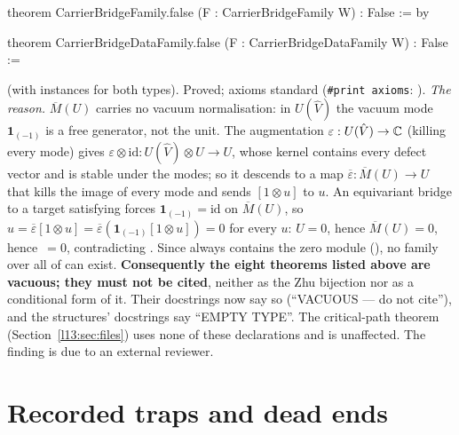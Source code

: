 \begin{warning}[title={The MU track's carrier-bridge families are empty: its ``trophy'' theorems are vacuous (serious; found by an external reviewer)}]
\begin{leancode}
theorem CarrierBridgeFamily.false (F : CarrierBridgeFamily W) : False := by

theorem CarrierBridgeDataFamily.false (F : CarrierBridgeDataFamily W) : False :=
\end{leancode}
(with  instances for both types). Proved; axioms standard (\texttt{\#print axioms}: ). \emph{The reason.} $\overline M(U)$ carries no vacuum normalisation: in $U(\hat V)$ the vacuum mode
$\mathbf 1_{(-1)}$ is a free generator, not the unit. The augmentation $\varepsilon:U(\hat V)\to{\mathbb{C}}$ (killing every mode) gives
$\varepsilon\otimes\mathrm{id}:U(\hat V)\otimes U\to U$, whose kernel contains every defect vector and is stable under the modes; so it
descends to a map $\overline\varepsilon:\overline M(U)\to U$ that kills the image of every mode and sends $[1\otimes u]$ to $u$. An
equivariant bridge to a target satisfying  forces $\mathbf 1_{(-1)}=\mathrm{id}$ on $\overline M(U)$, so
$u=\overline\varepsilon[1\otimes u]=\overline\varepsilon(\mathbf 1_{(-1)}[1\otimes u])=0$ for every $u$: $U=0$, hence $\overline M(U)=0$,
hence $\,=0$, contradicting . Since  always contains the zero module (), no
family over all of  can exist. \textbf{Consequently the eight theorems listed above are vacuous; they must not be cited},
neither as the Zhu bijection nor as a conditional form of it. Their docstrings now say so (``VACUOUS --- do not cite''), and the
structures' docstrings say ``EMPTY TYPE''. The critical-path theorem  (Section~\ref{l13:sec:files}) uses none of
these declarations and is unaffected. The finding is due to an external reviewer.
\end{warning}

\section{Recorded traps and dead ends}\label{l13:sec:traps}

